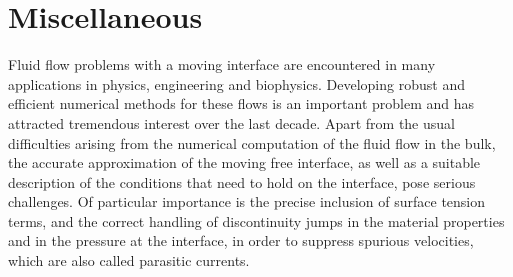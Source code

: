 \documentclass[a4paper,12pt,onecolumn]{article}
\begin{document}
\captionsetup[subfigure]{labelformat=empty} %

\section{Miscellaneous}

Fluid flow problems with a moving interface are encountered in many
applications in physics, engineering and biophysics. Developing robust and
efficient numerical methods for these flows is an important problem and
has attracted tremendous interest over the last decade. Apart from the usual
difficulties arising from the numerical computation of the fluid flow in the
bulk, the accurate approximation of the moving free interface, as well as a
suitable description of the conditions that need to hold on the interface,
pose serious challenges. Of particular importance is the precise inclusion of
surface tension terms, and the correct handling of discontinuity jumps in the
material properties and in the pressure at the interface, in order to suppress
spurious velocities, which are also called parasitic currents.
\end{document}
